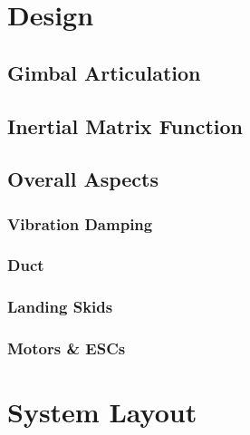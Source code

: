 \section{Design}
\label{sec:proto.design}
\subsection{Gimbal Articulation}
\label{subsec:proto.design.actuation}
\subsection{Inertial Matrix Function}
\label{subsec:proto.design.inertia}
\subsection{Overall Aspects}
\label{subsec:proto.design.aspects}
\subsubsection{Vibration Damping}
\subsubsection{Duct}
\subsubsection{Landing Skids}
\subsubsection{Motors \& ESCs}

\section{System Layout}
\label{sec:proto.layout}
